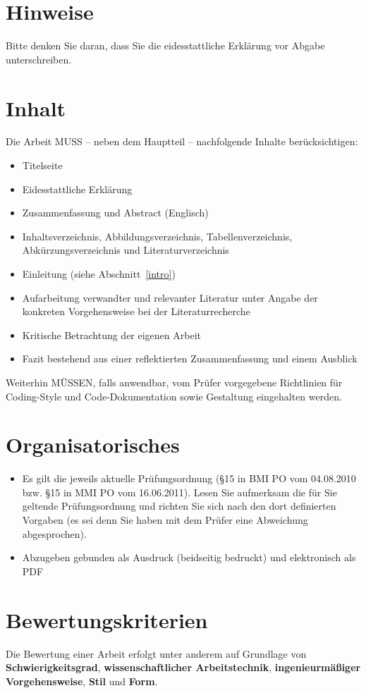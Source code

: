 \section{Hinweise}

Bitte denken Sie daran, dass Sie die eidesstattliche Erklärung vor Abgabe unterschreiben.

\section{Inhalt}

Die Arbeit MUSS -- neben dem Hauptteil -- nachfolgende Inhalte berücksichtigen:

\begin{itemize}
  \item Titelseite
  \item Eidesstattliche Erklärung
  \item Zusammenfassung und Abstract (Englisch)
  \item Inhaltsverzeichnis, Abbildungsverzeichnis, Tabellenverzeichnis, Abkürzungs\-ver\-zeichnis und Literaturverzeichnis
  \item Einleitung (siehe Abschnitt~\ref{intro})
  \item Aufarbeitung verwandter und relevanter Literatur unter Angabe der konkreten
  Vorgehensweise bei der Literaturrecherche
  \item Kritische Betrachtung der eigenen Arbeit
  \item Fazit bestehend aus einer reflektierten Zusammenfassung und einem Ausblick
\end{itemize}

Weiterhin MÜSSEN, falls anwendbar, vom Prüfer vorgegebene Richtlinien für Coding-Style
und Code-Dokumentation sowie Gestaltung eingehalten werden.

\section{Organisatorisches}

\begin{itemize}
 \item Es gilt die jeweils aktuelle Pr\"ufungsordnung (\S 15 in BMI PO vom 04.08.2010 bzw. \S 15 in MMI PO vom 16.06.2011).
 Lesen Sie aufmerksam die für Sie geltende Prüfungsordnung und richten Sie sich nach den dort
 definierten Vorgaben (es sei denn Sie haben mit dem Prüfer eine Abweichung abgesprochen).
 \item Abzugeben gebunden als Ausdruck (beidseitig bedruckt) und elektronisch als PDF
\end{itemize}

\section{Bewertungskriterien}

Die Bewertung einer Arbeit erfolgt unter anderem auf Grundlage von \textbf{Schwierigkeitsgrad},
\textbf{wissenschaftlicher Arbeitstechnik}, \textbf{ingenieurmäßiger Vorgehensweise}, \textbf{Stil} und \textbf{Form}.

